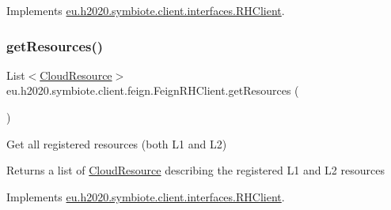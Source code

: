 Implements \hyperlink{interfaceeu_1_1h2020_1_1symbiote_1_1client_1_1interfaces_1_1RHClient_a13899a508ce181ceafd5e04fe5147a4a}{eu.\+h2020.\+symbiote.\+client.\+interfaces.\+R\+H\+Client}.

\mbox{\label{classeu_1_1h2020_1_1symbiote_1_1client_1_1feign_1_1FeignRHClient_a25d731190f6d9fd35552ec93a55f721c}} 
\subsubsection{\texorpdfstring{get\+Resources()}{getResources()}}
{\footnotesize\ttfamily List$<$\hyperlink{classeu_1_1h2020_1_1symbiote_1_1cloud_1_1model_1_1internal_1_1CloudResource}{Cloud\+Resource}$>$ eu.\+h2020.\+symbiote.\+client.\+feign.\+Feign\+R\+H\+Client.\+get\+Resources (\begin{DoxyParamCaption}{ }\end{DoxyParamCaption})}

Get all registered resources (both L1 and L2)

\begin{DoxyReturn}{Returns}
a list of \hyperlink{}{Cloud\+Resource} describing the registered L1 and L2 resources 
\end{DoxyReturn}


Implements \hyperlink{interfaceeu_1_1h2020_1_1symbiote_1_1client_1_1interfaces_1_1RHClient_a116bb408726cd3d423236c56bdd18af3}{eu.\+h2020.\+symbiote.\+client.\+interfaces.\+R\+H\+Client}.

\mbox{\label{classeu_1_1h2020_1_1symbiote_1_1client_1_1feign_1_1FeignRHClient_a2a7432c5df835ea79f3b5f1f4aec99bf}} 
